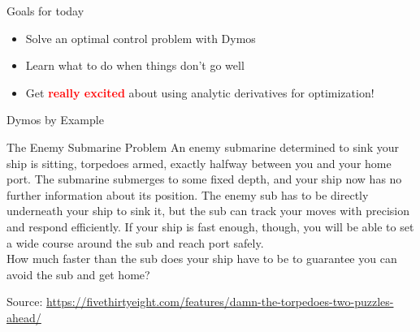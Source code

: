 \documentclass[aspectratio=169, usenames,dvipsnames, 14pt]{beamer}
\begin{document}
\begin{frame}{Goals for today}
    \begin{itemize}
        \item Solve an optimal control problem with Dymos
        \vspace{.5cm}
        \item Learn what to do when things don't go well
        \vspace{.5cm}
        \item Get \textcolor{red}{\textbf{really excited}} about using analytic derivatives for optimization!

    \end{itemize}
    
\end{frame}

\begin{frame}{Dymos by Example}
    \begin{block}{The Enemy Submarine Problem}
      \footnotesize
      An enemy submarine determined to sink your ship is sitting, torpedoes armed, exactly halfway between you and your home port. The submarine submerges to some fixed depth, and your ship now has no further information about its position. The enemy sub has to be directly underneath your ship to sink it, but the sub can track your moves with precision and respond efficiently. If your ship is fast enough, though, you will be able to set a wide course around the sub and reach port safely.\\
\vspace{1em}
How much faster than the sub does your ship have to be to guarantee you can avoid the sub and get home?\\
    \end{block}
    
    \tiny
    Source: \url{https://fivethirtyeight.com/features/damn-the-torpedoes-two-puzzles-ahead/}
\end{frame}
\end{document}
